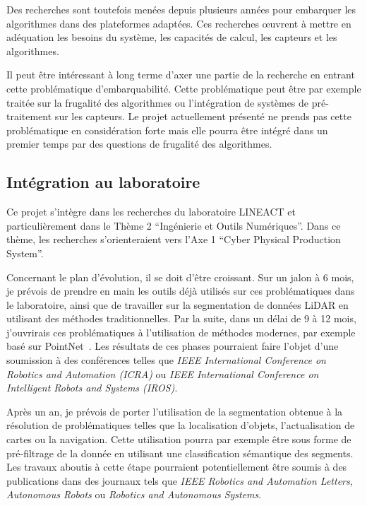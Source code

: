 \documentclass[a4paper, french, 10pt, onecolumn, notitlepage, roman]{article}
\begin{document}
Des recherches sont toutefois menées depuis plusieurs années pour embarquer les algorithmes dans des plateformes adaptées.
Ces recherches œuvrent à mettre en adéquation les besoins du système, les capacités de calcul, les capteurs et les algorithmes.

Il peut être intéressant à long terme d'axer une partie de la recherche en entrant cette problématique d'embarquabilité.
Cette problématique peut être par exemple traitée sur la frugalité des algorithmes ou l'intégration de systèmes de pré-traitement sur les capteurs.
Le projet actuellement présenté ne prends pas cette problématique en considération forte mais elle pourra être intégré dans un premier temps par des questions de frugalité des algorithmes.

\subsection{Intégration au laboratoire}

Ce projet s'intègre dans les recherches du laboratoire LINEACT et particulièrement dans le Thème 2 ``Ingénierie et Outils Numériques''.
Dans ce thème, les recherches s'orienteraient vers l'Axe 1 ``Cyber Physical Production System''.

Concernant le plan d'évolution, il se doit d'être croissant.
Sur un jalon à 6 mois, je prévois de prendre en main les outils déjà utilisés sur ces problématiques dans le laboratoire, ainsi que de travailler sur la segmentation de données LiDAR en utilisant des méthodes traditionnelles.
Par la suite, dans un délai de 9 à 12 mois, j'ouvrirais ces problématiques à l'utilisation de méthodes modernes, par exemple basé sur PointNet~\cite{qi:cvpr:2017}.
Les résultats de ces phases pourraient faire l'objet d'une soumission à des conférences telles que \emph{IEEE International Conference on Robotics and Automation (ICRA)} ou \emph{IEEE International Conference on Intelligent Robots and Systems (IROS)}.

Après un an, je prévois de porter l'utilisation de la segmentation obtenue à la résolution de problématiques telles que la localisation d'objets, l'actualisation de cartes ou la navigation.
Cette utilisation pourra par exemple être sous forme de pré-filtrage de la donnée en utilisant une classification sémantique des segments.
Les travaux aboutis à cette étape pourraient potentiellement être soumis à des publications dans des journaux tels que \emph{IEEE Robotics and Automation Letters}, \emph{Autonomous Robots} ou \emph{Robotics and Autonomous Systems}.
\end{document}
